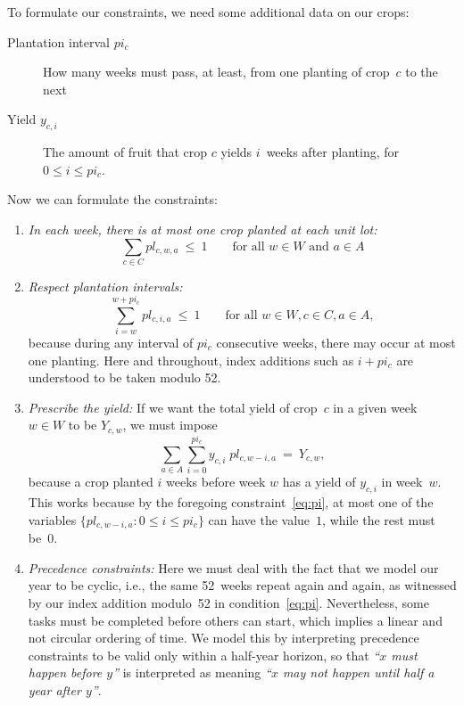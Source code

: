 \documentclass[11pt]{amsart}
\numberwithin{equation}{section}
\begin{document}
To formulate our constraints, we need some additional data on our
crops:
\begin{description}
\item[Plantation interval $pi_{c}$] How many weeks must pass, at
  least, from one planting of crop~$c$ to the next

\item[Yield $y_{c,i}$] The amount of fruit that crop $c$ yields
  $i$~weeks after planting, for $0\le i\le pi_c$.
\end{description}

Now  we can formulate the constraints:

\begin{enumerate}
\item \emph{In each week, there is at most one crop planted at each unit lot:}
\[
   \sum_{c\in C} pl_{c,w,a} \ \le \ 1
   \qquad\text{for all } w\in W \text{ and } a\in A
\]

\item\emph{Respect plantation intervals:}
\begin{equation}\label{eq:pi}
   \sum_{i=w}^{w+pi_c} pl_{c,i,a} \ \le \ 1
   \qquad\text{for all } w\in W, c\in C, a\in A,
\end{equation}
because during any interval of $pi_c$ consecutive weeks, there may
occur at most one planting.  Here and throughout, index additions such
as $i+pi_c$ are understood to be taken modulo 52.

\smallskip
\item\emph{Prescribe the yield:} If we want the total yield of crop~$c$ in
  a given week~$w\in W$ to be $Y_{c,w}$, we must impose
\[
    \sum_{a\in A} \sum_{i=0}^{pi_c} y_{c,i}\; pl_{c,w-i,a}
    \ = \
    Y_{c,w},
\]
because a crop planted $i$ weeks before week $w$ has a yield of
$y_{c,i}$ in week~$w$.  This works because by the foregoing
constraint~\eqref{eq:pi}, at most one of the variables
$\{pl_{c,w-i,a}:0\le i\le pi_c\}$ can have the value~$1$, while the rest must
be~$0$.

\smallskip
\item\emph{Precedence constraints:} Here we must deal with the fact
  that we model our year to be cyclic, i.e., the same 52~weeks repeat
  again and again, as witnessed by our index addition modulo~52 in
  condition~\eqref{eq:pi}. Nevertheless, some tasks must be completed
  before others can start, which implies a linear and not circular
  ordering of time. We model this by interpreting precedence
  constraints to be valid only within a half-year horizon, so
  that \emph{``$x$ must happen before $y$''} is interpreted as meaning
  \emph{``$x$ may not happen until half a year after $y$''}.


\end{enumerate}
\end{document}
